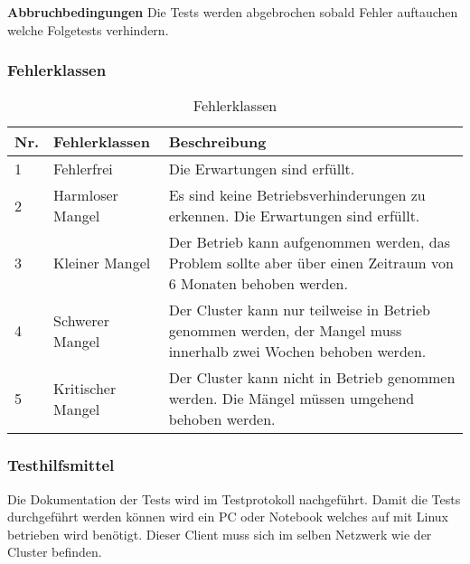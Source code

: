 \textbf{Abbruchbedingungen}\newline
Die Tests werden abgebrochen sobald Fehler auftauchen welche Folgetests verhindern.

\subsubsection{Fehlerklassen}
\begin{table}[H]
\centering
\begin{tabular}{p{1cm}p{4cm}p{11cm}}
\hline
\rowcolor{heading} \textbf{Nr.} & \textbf{Fehlerklassen} & \textbf{Beschreibung} \\\hline
1 & Fehlerfrei & Die Erwartungen sind erfüllt.  \\\hline
2 & Harmloser Mangel & Es sind keine Betriebsverhinderungen zu erkennen. Die Erwartungen sind erfüllt. \\\hline
3 & Kleiner Mangel & Der Betrieb kann aufgenommen werden, das Problem sollte aber über einen Zeitraum von 6 Monaten behoben werden.  \\\hline
4 & Schwerer Mangel & Der Cluster kann nur teilweise in Betrieb genommen werden, der Mangel muss innerhalb zwei Wochen behoben werden. \\\hline
5 & Kritischer Mangel & Der Cluster kann nicht in Betrieb genommen werden. Die Mängel müssen umgehend behoben werden. \\\hline
\end{tabular}
\caption{Fehlerklassen}
\end{table}

\subsubsection{Testhilfsmittel}
Die Dokumentation der Tests wird im Testprotokoll nachgeführt. Damit die Tests durchgeführt werden können wird ein PC oder Notebook welches auf mit Linux betrieben wird benötigt. Dieser Client muss sich im selben Netzwerk wie der Cluster befinden.

